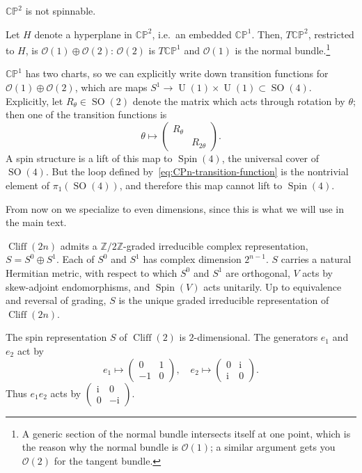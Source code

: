\documentclass[12pt,letterpaper,reqno]{article}
\numberwithin{equation}{section}
\newcommand{\cO}{\ensuremath{\mathcal O}}
\newcommand{\C}{\ensuremath{\mathbb C}}
\newcommand{\PP}{\ensuremath{\mathbb P}}
\newcommand{\Z}{\ensuremath{\mathbb Z}}
\newcommand{\I}{{\mathrm i}}
\DeclareMathOperator{\Spin}{Spin}
\DeclareMathOperator{\SO}{SO}
\DeclareMathOperator{\U}{U}
\DeclareMathOperator{\Cliff}{Cliff}
\begin{document}
\begin{prop} $\C\PP^2$ is not spinnable.
\end{prop}
\begin{pf}
Let $H$ denote a hyperplane in $\C\PP^2$, i.e.\ an embedded $\C\PP^1$. Then, $T\C\PP^2$, restricted to $H$, is
$\cO(1)\oplus\cO(2)$: $\cO(2)$ is $T\C\PP^1$ and $\cO(1)$ is the normal bundle.\footnote{A generic section of the
normal bundle intersects itself at one point, which is the reason why the normal bundle is $\cO(1)$; a similar
argument gets you $\cO(2)$ for the tangent bundle.}

$\C\PP^1$ has two charts, so we can explicitly write down transition functions for $\cO(1)\oplus\cO(2)$, which are
maps $S^1\to\U(1)\times\U(1)\subset\SO(4)$. Explicitly, let $R_\theta\in\SO(2)$ denote the matrix which acts
through rotation by $\theta$; then one of the transition functions is
\begin{equation}
\label{eq:CPn-transition-function}
\theta\mapsto\begin{pmatrix} R_\theta\\& R_{2\theta}\end{pmatrix}.
\end{equation}
A spin structure is a lift of this map to $\Spin(4)$, the universal cover of $\SO(4)$. But the loop defined
by~\eqref{eq:CPn-transition-function} is the nontrivial element of $\pi_1(\SO(4))$, and therefore this map cannot
lift to $\Spin(4)$.
\end{pf}

From now on we specialize to even dimensions, since this is what we will use in
the main text.

\begin{prop} 
$\Cliff(2n)$ admits a $\Z/2\Z$-graded irreducible complex representation, $S = S^0 \oplus S^1$. 
Each of $S^0$ and $S^1$ has complex dimension $2^{n-1}$. $S$ carries a natural Hermitian 
metric, with respect to which $S^0$ and $S^1$ are orthogonal, $V$ 
acts by skew-adjoint endomorphisms, 
and $\Spin(V)$ acts unitarily.
Up to equivalence and reversal of grading, $S$ is the unique graded irreducible representation
of $\Cliff(2n)$.
\end{prop}

\begin{example} The spin representation 
$S$ of $\Cliff(2)$ is $2$-dimensional. The generators $e_1$ and $e_2$ act by
\begin{equation}
  e_1 \mapsto \begin{pmatrix} 0 & 1 \\ -1 & 0 \end{pmatrix}, \quad   e_2 \mapsto \begin{pmatrix} 0 & \I \\ \I & 0 \end{pmatrix}.
\end{equation}
Thus $e_1 e_2$ acts by $\begin{pmatrix} \I & 0 \\ 0 & -\I \end{pmatrix}$.
\end{example}
\end{document}
